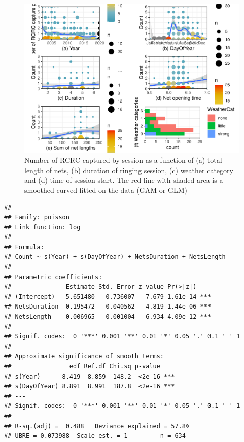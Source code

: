 \documentclass[]{interact}
\theoremstyle{plain}%
\theoremstyle{definition}
\theoremstyle{remark}
\begin{document}
\begin{figure}
\centering
\includegraphics{manuscript_files/figure-latex/unnamed-chunk-10-1.pdf}
\caption{Number of RCRC captured by session as a function of (a) total
length of nets, (b) duration of ringing session, (c) weather category
and (d) time of session start. The red line with shaded area is a
smoothed curved fitted on the data (GAM or GLM)}
\end{figure}

\begin{verbatim}
## 
## Family: poisson 
## Link function: log 
## 
## Formula:
## Count ~ s(Year) + s(DayOfYear) + NetsDuration + NetsLength
## 
## Parametric coefficients:
##               Estimate Std. Error z value Pr(>|z|)    
## (Intercept)  -5.651480   0.736007  -7.679 1.61e-14 ***
## NetsDuration  0.195472   0.040562   4.819 1.44e-06 ***
## NetsLength    0.006965   0.001004   6.934 4.09e-12 ***
## ---
## Signif. codes:  0 '***' 0.001 '**' 0.01 '*' 0.05 '.' 0.1 ' ' 1
## 
## Approximate significance of smooth terms:
##                edf Ref.df Chi.sq p-value    
## s(Year)      8.419  8.859  148.2  <2e-16 ***
## s(DayOfYear) 8.891  8.991  187.8  <2e-16 ***
## ---
## Signif. codes:  0 '***' 0.001 '**' 0.01 '*' 0.05 '.' 0.1 ' ' 1
## 
## R-sq.(adj) =  0.488   Deviance explained = 57.8%
## UBRE = 0.073988  Scale est. = 1         n = 634
\end{verbatim}
\end{document}
